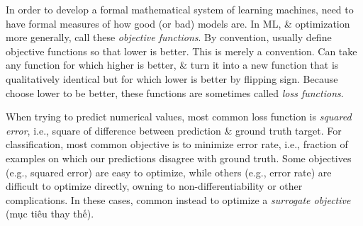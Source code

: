 \documentclass{article}
\begin{document}
\begin{itemize}
\begin{itemize}
\begin{itemize}
			In order to develop a formal mathematical system of learning machines, need to have formal measures of how good (or bad) models are. In ML, \& optimization more generally, call these {\it objective functions}. By convention, usually define objective functions so that lower is better. This is merely a convention. Can take any function for which higher is better, \& turn it into a new function that is qualitatively identical but for which lower is better by flipping sign. Because choose lower to be better, these functions are sometimes called {\it loss functions}.
			
			When trying to predict numerical values, most common loss function is {\it squared error}, i.e., square of difference between prediction \& ground truth target. For classification, most common objective is to minimize error rate, i.e., fraction of examples on which our predictions disagree with ground truth. Some objectives (e.g., squared error) are easy to optimize, while others (e.g., error rate) are difficult to optimize directly, owning to non-differentiability or other complications. In these cases, common instead to optimize a {\it surrogate objective} (mục tiêu thay thế).
			

\end{itemize}
\end{itemize}
\end{itemize}
\end{document}
